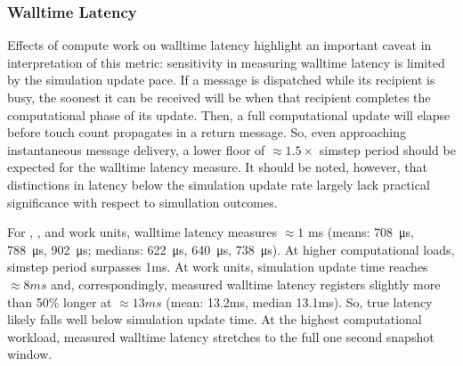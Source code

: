 
\subsubsection{Walltime Latency}

Effects of compute work on walltime latency highlight an important caveat in interpretation of this metric: sensitivity in measuring walltime latency is limited by the simulation update pace.
If a message is dispatched while its recipient is busy, the soonest it can be received will be when that recipient completes the computational phase of its update.
Then, a full computational update will elapse before touch count propagates in a return message.
So, even approaching instantaneous message delivery, a lower floor of $\approx 1.5 \times$ simstep period should be expected for the walltime latency measure.
It should be noted, however, that distinctions in latency below the simulation update rate largely lack practical significance with respect to simullation outcomes.

For , , and  work units, walltime latency measures $\approx 1$ ms (means: \SI{708}{\micro\second}, \SI{788}{\micro\second}, \SI{902}{\micro\second}; medians: \SI{622}{\micro\second}, \SI{640}{\micro\second}, \SI{738}{\micro\second}).
At higher computational loads, simstep period surpasses 1ms.
At  work units, simulation update time reaches $\approx 8ms$ and, correspondingly, measured walltime latency registers slightly more than 50\% longer at $\approx 13ms$ (mean: 13.2ms, median 13.1ms).
So, true latency likely falls well below simulation update time.
At the highest computational workload, measured walltime latency stretches to the full one second snapshot window.

